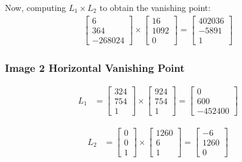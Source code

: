 \documentclass[12pt, oneside]{article}
\begin{document}
Now, computing $L_1 \times L_2$ to obtain the vanishing point:
\begin{align*}
    \begin{bmatrix}
        6  \\
        364 \\
        -268024 
    \end{bmatrix}     \times 
    \begin{bmatrix}
        16  \\
        1092 \\
        0 
    \end{bmatrix}    = 
    \begin{bmatrix}
        402036  \\
        -5891 \\
        1 
    \end{bmatrix}
\end{align*}


\subsubsection*{Image 2 Horizontal Vanishing Point}

\begin{align*}
    L_1 &=    \begin{bmatrix}
                324 \\
                754 \\
                1
            \end{bmatrix} \times 
            \begin{bmatrix}
                924 \\
                754 \\
                1
            \end{bmatrix}  = 
            \begin{bmatrix}
                0  \\
                600 \\
                -452400 
            \end{bmatrix}                                                   
    \end{align*}
    
    \begin{align*}
    L_2 &=    \begin{bmatrix}
                0 \\
                0 \\
                1
            \end{bmatrix} \times 
            \begin{bmatrix}
                1260 \\
                6 \\
                1
            \end{bmatrix}  = 
            \begin{bmatrix}
                -6  \\
                1260 \\
                0 
            \end{bmatrix}                                                   
    \end{align*}
    
\end{document}
